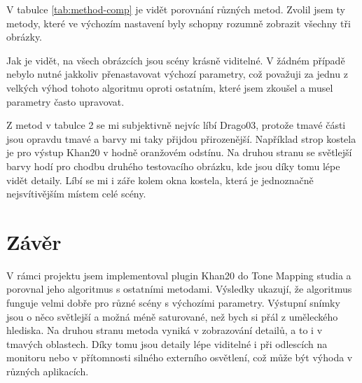 \documentclass[11pt,a4paper,oneside]{article}
\begin{document}
V tabulce \ref{tab:method-comp} je vidět porovnání různých metod. Zvolil jsem ty
metody, které ve výchozím nastavení byly schopny rozumně zobrazit všechny tři
obrázky.

Jak je vidět, na všech obrázcích jsou scény krásně viditelné. V žádném případě
nebylo nutné jakkoliv přenastavovat výchozí parametry, což považuji za jednu z
velkých výhod tohoto algoritmu oproti ostatním, které jsem zkoušel a musel
parametry často upravovat.

Z metod v tabulce 2 se mi subjektivně nejvíc líbí Drago03, protože tmavé části
jsou opravdu tmavé a barvy mi taky přijdou přirozenější. Například strop kostela je 
pro výstup Khan20 v hodně oranžovém odstínu. Na druhou stranu se světlejší barvy hodí pro chodbu
druhého testovacího obrázku, kde jsou díky tomu lépe vidět detaily. Líbí se mi i
záře kolem okna kostela, která je jednoznačně nejsvítivějším místem celé scény.

\section{Závěr}

V rámci projektu jsem implementoval plugin Khan20 do Tone Mapping studia a
porovnal jeho algoritmus s ostatními metodami. Výsledky ukazují, že algoritmus
funguje velmi dobře pro různé scény s výchozími parametry. Výstupní snímky jsou
o něco světlejší a možná méně saturované, než bych si přál z uměleckého
hlediska. Na druhou stranu metoda vyniká v zobrazování detailů, a to i v tmavých
oblastech. Díky tomu jsou detaily lépe viditelné i při odlescích na monitoru
nebo v přítomnosti silného externího osvětlení, což může být výhoda v různých
aplikacích.



\end{document}
